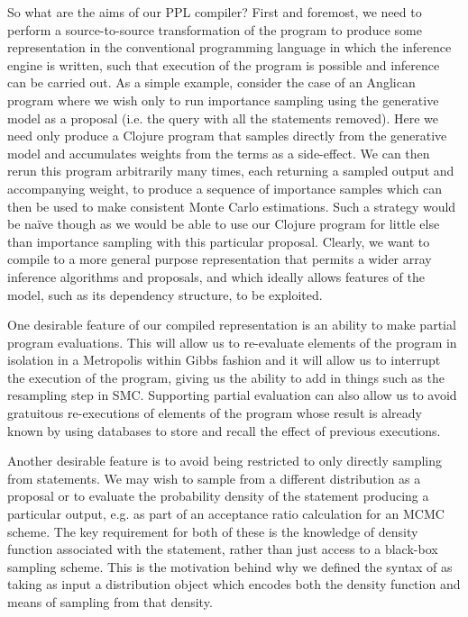 So what are the aims of our PPL compiler?  First and foremost, we need to
perform a source-to-source transformation of the program to
produce some representation in the conventional programming language in which
the inference engine is written, such that execution of the program is possible and inference
can be carried out.  As a simple example, consider the case of an Anglican program where
we wish only to run importance sampling using the generative model as a proposal 
(i.e. the query with all the \observe statements removed).  Here we need only produce a Clojure program
that samples directly from the generative model and accumulates weights from the
\observe terms as a side-effect.  We can then rerun this program arbitrarily many
times, each returning a sampled output and accompanying weight, to produce a sequence
of importance samples which can then be used to make consistent Monte Carlo estimations.
Such a strategy would be na\"{i}ve though as we would be able to use our Clojure program
for little else than importance sampling with this particular proposal.  Clearly, we want
to compile to a more general purpose representation that permits a wider array inference algorithms
and proposals, and which ideally allows features of the model, such as its dependency
structure, to be exploited.

One desirable feature of our compiled representation is an ability to make partial
program evaluations.  This will allow us to re-evaluate elements of the program in
isolation in a Metropolis within Gibbs fashion and it will allow us to interrupt the execution
of the program, giving us the ability to add in things such as the resampling step in SMC.
Supporting partial evaluation can also allow us to avoid gratuitous re-executions of
elements of the program whose result is already known by using databases to store and
recall the effect of previous executions.

Another desirable feature is to avoid being restricted to only directly sampling from \sample
statements.  We may wish to sample from a different distribution as a proposal or to evaluate
the probability density of the \sample statement producing a particular output, e.g. as part
of an acceptance ratio calculation for an MCMC scheme.  The key requirement for both of these
is the knowledge of density function associated with the \sample statement, rather than
just access to a black-box sampling scheme.  This is the motivation behind why we defined
the syntax of \sample as taking as input a distribution object which encodes both the density
function and means of sampling from that density.

